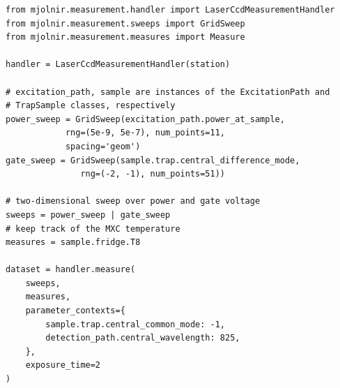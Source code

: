 \begin{listing}[htpb]
    \begin{verbatim}
from mjolnir.measurement.handler import LaserCcdMeasurementHandler
from mjolnir.measurement.sweeps import GridSweep
from mjolnir.measurement.measures import Measure

handler = LaserCcdMeasurementHandler(station)

# excitation_path, sample are instances of the ExcitationPath and
# TrapSample classes, respectively
power_sweep = GridSweep(excitation_path.power_at_sample,
			rng=(5e-9, 5e-7), num_points=11,
			spacing='geom')
gate_sweep = GridSweep(sample.trap.central_difference_mode,
		       rng=(-2, -1), num_points=51))

# two-dimensional sweep over power and gate voltage
sweeps = power_sweep | gate_sweep
# keep track of the MXC temperature
measures = sample.fridge.T8

dataset = handler.measure(
    sweeps,
    measures,
    parameter_contexts={
        sample.trap.central_common_mode: -1,
        detection_path.central_wavelength: 825,
    },
    exposure_time=2
)
    \end{verbatim}
    \caption[\mjolnir measurement workflow]{
    Setup and measurement workflow using the \mjolnir package.
         is a \qcodes {} object managing the instruments.
        The  object describes a nested loop on whose inner iteration the difference mode parameter of the trap's central gate is swept over a linear grid and on whose outer iteration the laser power, adjusted for the \acrlong{bs} ratio, is swept over a logarithmically spaced grid.
        No dependent parameters ( objects) need to be explicitly specified as the  measures the \gls{ccd} spectrum as well as laser power and leakage currents of the swept gates by default.
        The  argument is used to set the spectrometer wavelength to \qty{825}{\nano\meter} and the common mode voltage of the active trap to \qty{-1}{\volt}.
        The  argument is passed through to the  method, where it is used to set up the \gls{ccd} for acquisition.
    }
    \label{lst:exp:mjolnir:workflow}
\end{listing}

